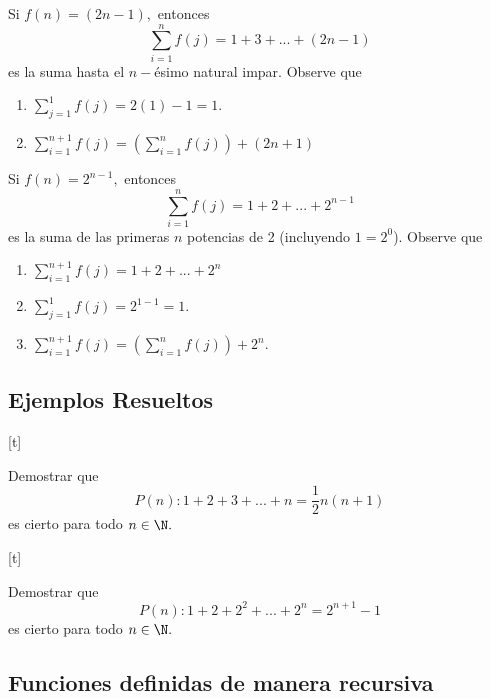 	\begin{problema}
		Si $f(n)=(2n-1),$ entonces
		$$
		\sum_{i=1}^{n}f(j)=1+3+...+\left( 2n-1 \right)
		$$ es la suma hasta el $n-$\'esimo natural impar.  Observe que 
		\begin{enumerate}
			\item $\sum_{j=1}^{1}f(j)=2(1)-1=1.$
			\item $\sum_{i=1}^{n+1}f(j)=\left( \sum_{i=1}^{n}f(j) \right)+\left( 2n+1 \right)$
		\end{enumerate}
		
	\end{problema}
	



	\begin{problema}
		Si $f(n)=2^{n-1},$ entonces
		$$
		\sum_{i=1}^{n}f(j)=1+2+...+2^{n-1}
		$$ es la suma de las primeras $n$ potencias de 2 (incluyendo $1=2^{0}$).  Observe que 
		\begin{enumerate}
			\item $\sum_{i=1}^{n+1}f(j)=1+2+...+2^{n}$
			\item $\sum_{j=1}^{1}f(j)=2^{1-1}=1.$
			\item $\sum_{i=1}^{n+1}f(j)=\left( \sum_{i=1}^{n}f(j) \right)+2^{n}.$
		\end{enumerate}
		
	\end{problema}
	


\subsection{Ejemplos Resueltos}

[t]
	\begin{problema}
		Demostrar que $$P(n): 1+2+3+...+n=\frac{1}{2}n\left( n+1 \right)$$
		es cierto para todo $n \in \N.$
	\end{problema}
	


[t]
	\begin{problema}
		Demostrar que $$P(n): 1+2+2^{2}+...+2^{n}=2^{n+1}-1$$
		es cierto para todo $n \in \N.$
	\end{problema}
	


\subsection{Funciones definidas de manera recursiva}



